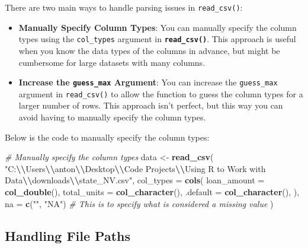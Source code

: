 \documentclass[
]{book}
\newenvironment{Shaded}{\begin{snugshade}}{\end{snugshade}}
\newcommand{\AttributeTok}[1]{\textcolor[rgb]{0.13,0.29,0.53}{#1}}
\newcommand{\CommentTok}[1]{\textcolor[rgb]{0.56,0.35,0.01}{\textit{#1}}}
\newcommand{\FunctionTok}[1]{\textcolor[rgb]{0.13,0.29,0.53}{\textbf{#1}}}
\newcommand{\NormalTok}[1]{#1}
\newcommand{\OtherTok}[1]{\textcolor[rgb]{0.56,0.35,0.01}{#1}}
\newcommand{\SpecialCharTok}[1]{\textcolor[rgb]{0.81,0.36,0.00}{\textbf{#1}}}
\newcommand{\StringTok}[1]{\textcolor[rgb]{0.31,0.60,0.02}{#1}}
\providecommand{\tightlist}{%
  \setlength{\itemsep}{0pt}\setlength{\parskip}{0pt}}
\begin{document}
There are two main ways to handle parsing issues in \texttt{read\_csv()}:

\begin{itemize}
\tightlist
\item
  \textbf{Manually Specify Column Types}: You can manually specify the column types using the \texttt{col\_types} argument in \textbf{\texttt{read\_csv()}}. This approach is useful when you know the data types of the columns in advance, but might be cumbersome for large datasets with many columns.
\item
  \textbf{Increase the \texttt{guess\_max} Argument}: You can increase the \texttt{guess\_max} argument in \texttt{read\_csv()} to allow the function to guess the column types for a larger number of rows. This approach isn't perfect, but this way you can avoid having to manually specify the column types.
\end{itemize}

Below is the code to manually specify the column types:

\begin{Shaded}
\begin{Highlighting}[]
\CommentTok{\# Manually specify the column types}
\NormalTok{data }\OtherTok{\textless{}{-}} \FunctionTok{read\_csv}\NormalTok{(}
  \StringTok{"C:}\SpecialCharTok{\textbackslash{}\textbackslash{}}\StringTok{Users}\SpecialCharTok{\textbackslash{}\textbackslash{}}\StringTok{anton}\SpecialCharTok{\textbackslash{}\textbackslash{}}\StringTok{Desktop}\SpecialCharTok{\textbackslash{}\textbackslash{}}\StringTok{Code Projects}\SpecialCharTok{\textbackslash{}\textbackslash{}}\StringTok{Using R to Work with Data}\SpecialCharTok{\textbackslash{}\textbackslash{}}\StringTok{downloads}\SpecialCharTok{\textbackslash{}\textbackslash{}}\StringTok{state\_NV.csv"}\NormalTok{,}
  \AttributeTok{col\_types =} \FunctionTok{cols}\NormalTok{(}
    \AttributeTok{loan\_amount =} \FunctionTok{col\_double}\NormalTok{(),}
    \AttributeTok{total\_units =} \FunctionTok{col\_character}\NormalTok{(),}
    \AttributeTok{.default =} \FunctionTok{col\_character}\NormalTok{(),}
\NormalTok{  ),}
  \AttributeTok{na =} \FunctionTok{c}\NormalTok{(}\StringTok{""}\NormalTok{, }\StringTok{"NA"}\NormalTok{) }\CommentTok{\# This is to specify what is considered a missing value}
\NormalTok{  )}
\end{Highlighting}
\end{Shaded}

\hypertarget{handling-file-paths}{%
\subsection{Handling File Paths}\label{handling-file-paths}}
\end{document}
